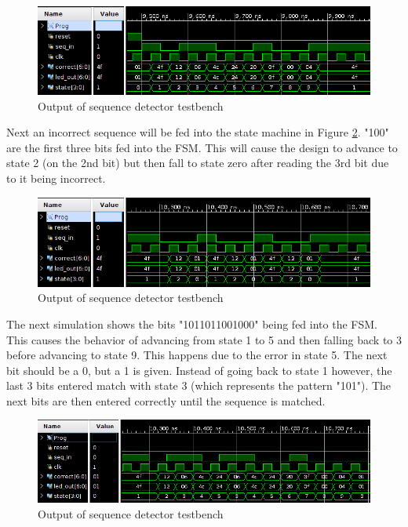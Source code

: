 \documentclass[12pt]{article}
\begin{document}
\begin{figure}[H]
    \centering
    \includegraphics[width=1\textwidth]{zero_to_9}
    \caption{Output of sequence detector testbench}
    \label{fig:zero_to_9}
\end{figure}

Next an incorrect sequence will be fed into the state machine in Figure \ref{fig:break_early}.
"100" are the first
three bits fed into the FSM. This will cause the design to advance to state 2 (on the
2nd bit) but then fall to state zero after reading the 3rd bit due to it being incorrect.

\begin{figure}[H]
    \centering
    \includegraphics[width=1\textwidth]{break_early}
    \caption{Output of sequence detector testbench}
    \label{fig:break_early}
\end{figure}

The next simulation shows 
the bits "1011011001000" being fed into the FSM. This causes the behavior of advancing
from state 1 to 5 and then falling back to 3 before advancing to state 9. This happens
due to the error in state 5. The next bit should be a 0, but a 1 is given. Instead of
going back to state 1 however, the last 3 bits entered match with state 3 (which represents
the pattern "101"). The next bits are then entered correctly until the sequence is matched.

\begin{figure}[H]
    \centering
    \includegraphics[width=1\textwidth]{break_and_continue}
    \caption{Output of sequence detector testbench}
    \label{fig:break_and_continue}
\end{figure}
\end{document}
